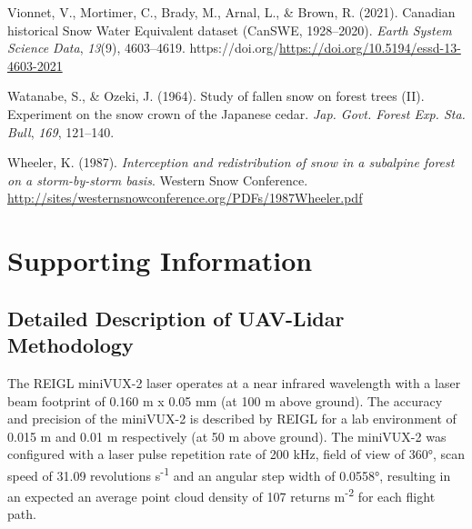 \documentclass[
  letterpaper,
  DIV=11,
  numbers=noendperiod]{scrartcl}
\newlength{\cslhangindent}
\newenvironment{CSLReferences}[2] %
 {\begin{list}{}{%
  \setlength{\itemindent}{0pt}
  \setlength{\leftmargin}{0pt}
  \setlength{\parsep}{0pt}
  \ifodd #1
   \setlength{\leftmargin}{\cslhangindent}
   \setlength{\itemindent}{-1\cslhangindent}
  \fi
  \setlength{\itemsep}{#2\baselineskip}}}
 {\end{list}}
\begin{document}
\begin{CSLReferences}{1}{0}
Vionnet, V., Mortimer, C., Brady, M., Arnal, L., \& Brown, R. (2021).
{Canadian historical Snow Water Equivalent dataset (CanSWE,
1928--2020)}. \emph{Earth System Science Data}, \emph{13}(9),
4603--4619.
https://doi.org/\url{https://doi.org/10.5194/essd-13-4603-2021}

Watanabe, S., \& Ozeki, J. (1964). {Study of fallen snow on forest trees
(II). Experiment on the snow crown of the Japanese cedar}. \emph{Jap.
Govt. Forest Exp. Sta. Bull}, \emph{169}, 121--140.

Wheeler, K. (1987). \emph{{Interception and redistribution of snow in a
subalpine forest on a storm-by-storm basis}}. Western Snow Conference.
\url{http://sites/westernsnowconference.org/PDFs/1987Wheeler.pdf}

\end{CSLReferences}

\section{Supporting Information}\label{supporting-information}

\subsection{Detailed Description of UAV-Lidar
Methodology}\label{detailed-description-of-uav-lidar-methodology}

The REIGL miniVUX-2 laser operates at a near infrared wavelength with a
laser beam footprint of 0.160 m x 0.05 mm (at 100 m above ground). The
accuracy and precision of the miniVUX-2 is described by REIGL for a lab
environment of 0.015 m and 0.01 m respectively (at 50 m above ground).
The miniVUX-2 was configured with a laser pulse repetition rate of 200
kHz, field of view of 360°, scan speed of 31.09 revolutions
s\textsuperscript{-1} and an angular step width of 0.0558°, resulting in
an expected an average point cloud density of 107 returns
m\textsuperscript{-2} for each flight path.
\end{document}
